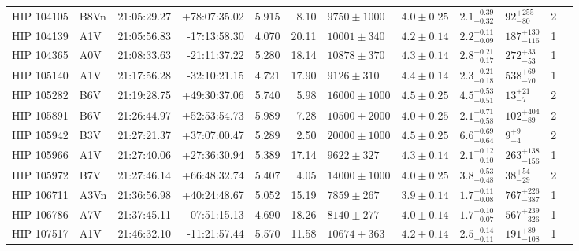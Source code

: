 \begin{tiny}
\begin{longtable}{|l|lrrrrllllll|}
  HIP 104105 &     B8Vn &    21:05:29.27 &   +78:07:35.02 &   5.915 &      8.10 &   $9750 \pm 1000$ &  $4.0 \pm 0.25$ &  $2.1^{+0.39}_{-0.32}$ &     $92^{+255}_{-80}$ &       2 \\
  HIP 104139 &      A1V &    21:05:56.83 &   -17:13:58.30 &   4.070 &     20.11 &   $10001 \pm 340$ &  $4.2 \pm 0.14$ &  $2.2^{+0.11}_{-0.09}$ &   $187^{+130}_{-116}$ &       1 \\
  HIP 104365 &      A0V &    21:08:33.63 &   -21:11:37.22 &   5.280 &     18.14 &   $10878 \pm 370$ &  $4.3 \pm 0.14$ &  $2.8^{+0.21}_{-0.17}$ &     $272^{+33}_{-53}$ &       1 \\
  HIP 105140 &      A1V &    21:17:56.28 &   -32:10:21.15 &   4.721 &     17.90 &    $9126 \pm 310$ &  $4.4 \pm 0.14$ &  $2.3^{+0.21}_{-0.18}$ &     $538^{+69}_{-70}$ &       1 \\
  HIP 105282 &      B6V &    21:19:28.75 &   +49:30:37.06 &   5.740 &      5.98 &  $16000 \pm 1000$ &  $4.5 \pm 0.25$ &  $4.5^{+0.53}_{-0.51}$ &       $13^{+21}_{-7}$ &       2 \\
  HIP 105891 &      B6V &    21:26:44.97 &   +52:53:54.73 &   5.989 &      7.28 &  $10500 \pm 2000$ &  $4.0 \pm 0.25$ &  $2.1^{+0.71}_{-0.58}$ &    $102^{+404}_{-89}$ &       2 \\
  HIP 105942 &      B3V &    21:27:21.37 &   +37:07:00.47 &   5.289 &      2.50 &  $20000 \pm 1000$ &  $4.5 \pm 0.25$ &  $6.6^{+0.69}_{-0.64}$ &         $9^{+9}_{-4}$ &       2 \\
  HIP 105966 &      A1V &    21:27:40.06 &   +27:36:30.94 &   5.389 &     17.14 &    $9622 \pm 327$ &  $4.3 \pm 0.14$ &  $2.1^{+0.12}_{-0.10}$ &   $263^{+138}_{-156}$ &       1 \\
  HIP 105972 &      B7V &    21:27:46.14 &   +66:48:32.74 &   5.407 &      4.05 &  $14000 \pm 1000$ &  $4.0 \pm 0.25$ &  $3.8^{+0.53}_{-0.48}$ &      $38^{+54}_{-29}$ &       2 \\
  HIP 106711 &     A3Vn &    21:36:56.98 &   +40:24:48.67 &   5.052 &     15.19 &    $7859 \pm 267$ &  $3.9 \pm 0.14$ &  $1.7^{+0.11}_{-0.08}$ &   $767^{+226}_{-387}$ &       1 \\
  HIP 106786 &      A7V &    21:37:45.11 &   -07:51:15.13 &   4.690 &     18.26 &    $8140 \pm 277$ &  $4.0 \pm 0.14$ &  $1.7^{+0.10}_{-0.07}$ &   $567^{+239}_{-326}$ &       1 \\
  HIP 107517 &      A1V &    21:46:32.10 &   -11:21:57.44 &   5.570 &     11.58 &   $10674 \pm 363$ &  $4.2 \pm 0.14$ &  $2.5^{+0.14}_{-0.11}$ &    $191^{+89}_{-108}$ &       1 \\

\end{longtable}
\end{tiny}
